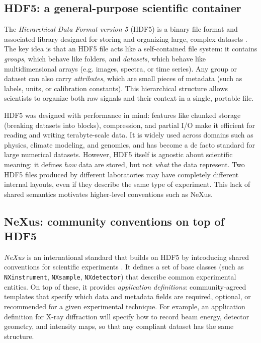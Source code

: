 \subsection{HDF5: a general-purpose scientific container}

The \textit{Hierarchical Data Format version 5} (HDF5) is a binary file format and associated library designed for storing and organizing large, complex datasets \parencite{nexusManual}. 
The key idea is that an HDF5 file acts like a self-contained file system: it contains \textit{groups}, which behave like folders, and \textit{datasets}, which behave like multidimensional arrays (e.g. images, spectra, or time series). 
Any group or dataset can also carry \textit{attributes}, which are small pieces of metadata (such as labels, units, or calibration constants). 
This hierarchical structure allows scientists to organize both raw signals and their context in a single, portable file. 

HDF5 was designed with performance in mind: features like chunked storage (breaking datasets into blocks), compression, and partial I/O make it efficient for reading and writing terabyte-scale data. 
It is widely used across domains such as physics, climate modeling, and genomics, and has become a de facto standard for large numerical datasets. 
However, HDF5 itself is agnostic about scientific meaning: it defines \emph{how} data are stored, but not \emph{what} the data represent. 
Two HDF5 files produced by different laboratories may have completely different internal layouts, even if they describe the same type of experiment. 
This lack of shared semantics motivates higher-level conventions such as NeXus.

\subsection{NeXus: community conventions on top of HDF5}

\textit{NeXus} is an international standard that builds on HDF5 by introducing shared conventions for scientific experiments \parencite{nxcanSASguide,nxvalidate}. 
It defines a set of base classes (such as \texttt{NXinstrument}, \texttt{NXsample}, \texttt{NXdetector}) that describe common experimental entities. 
On top of these, it provides \textit{application definitions}: community-agreed templates that specify which data and metadata fields are required, optional, or recommended for a given experimental technique. 
For example, an application definition for X-ray diffraction will specify how to record beam energy, detector geometry, and intensity maps, so that any compliant dataset has the same structure. 

